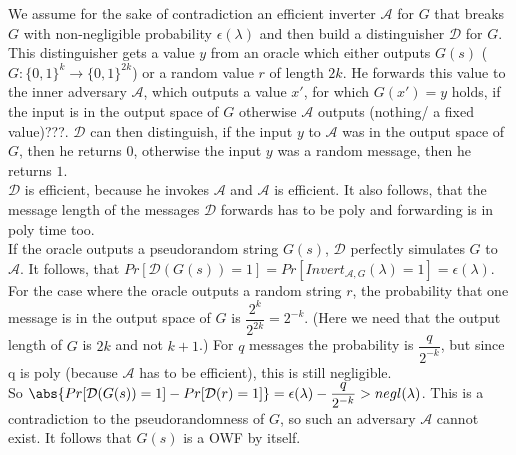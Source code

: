 We assume for the sake of contradiction an efficient inverter \(\mathcal{A}\) for \(G\) that breaks \(G\) with non-negligible probability \(\epsilon(\lambda)\) and then build a distinguisher \(\mathcal{D}\) for \(G\). This distinguisher gets a value \(y\) from an oracle which either outputs \(G(s)\) (\(G : \{0,1\}^k \rightarrow \{0,1\}^{2k}\)) or a random value \(r\) of length \(2k\). He forwards this value to the inner adversary \(\mathcal{A}\), which outputs a value \(x'\), for which \(G(x') = y\) holds, if the input is in the output space of \(G\) otherwise \(\mathcal{A}\) outputs (nothing/ a fixed value)???. 
\(\mathcal{D}\) can then distinguish, if the input \(y\) to \(\mathcal{A}\) was in the  output space of \(G\), then he returns \(0\), otherwise the input \(y\) was a random message, then he returns \(1\). \\
\(\mathcal{D}\) is efficient, because he invokes \(\mathcal{A}\) and \(\mathcal{A}\) is efficient. It also follows, that the message length of the messages \(\mathcal{D}\) forwards has to be poly and forwarding is in poly time too. \\
If the oracle outputs a pseudorandom string \(G(s)\), \(\mathcal{D}\) perfectly simulates \(G\) to \(\mathcal{A}\). It follows, that \(Pr[\mathcal{D}(G(s)) = 1] = Pr[Invert_{\mathcal{A},G}(\lambda) = 1] = \epsilon(\lambda)\).\\
For the case where the oracle outputs a random string \(r\), the probability that one message is in the output space of \(G\) is \(\dfrac{2^k}{2^{2k}} = 2^{-k}\). (Here we need that the output length of \(G\) is \(2k\) and not \(k+1\).) For \(q\) messages the probability is \(\dfrac{q}{2^{-k}}\), but since q is poly (because \(\mathcal{A}\) has to be efficient), this is still negligible. \\
So \(\abs{Pr[\mathcal{D}(G(s)) = 1] - Pr[\mathcal{D}(r) = 1] } = \epsilon(\lambda) - \dfrac{q}{2^{-k}} > negl(\lambda)\). This is a contradiction to the pseudorandomness of \(G\), so such an adversary \(\mathcal{A}\) cannot exist. 
It follows that \(G(s)\) is a OWF by itself. 


  